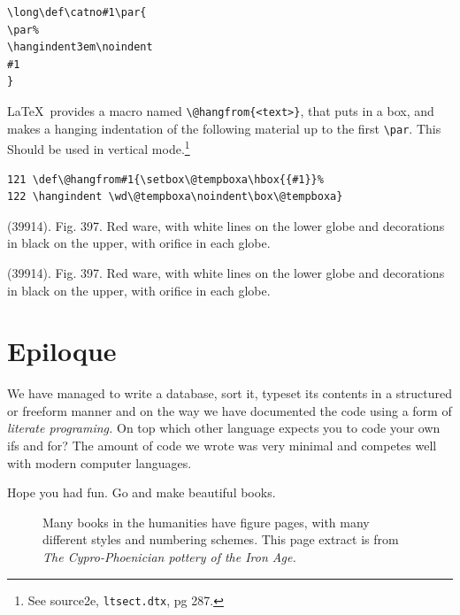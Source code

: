 \begin{verbatim}
\long\def\catno#1\par{
\par%
\hangindent3em\noindent
#1
}
\end{verbatim}


\def\catno#1#2{%
    \@hangfrom{#1. }#2
}


\DescribeMacro{\@hangfrom}   
\LaTeX\ provides a macro named \verb+\@hangfrom{<text>}+, that puts  in a box, and makes a hanging indentation of the following material up to the first \verb+\par+. This Should be used in vertical mode.\footnote{See source2e, \texttt{ltsect.dtx}, pg 287.}

\begin{verbatim}
121 \def\@hangfrom#1{\setbox\@tempboxa\hbox{{#1}}%
122 \hangindent \wd\@tempboxa\noindent\box\@tempboxa}
\end{verbatim}

\medskip

\catno{289}{(39914). Fig. 397. Red ware, with white lines on the lower globe and decorations in black on the upper, with orifice in each globe.}

\catno{1289}{(39914). Fig. 397. Red ware, with white lines on the lower globe and decorations in black on the upper, with orifice in each globe.}


\makeatother

\section{Epiloque}

We have managed to write a database, sort it, typeset its contents in a structured or freeform manner
and on the way we have documented the code using a form of \textit{literate programing.} On top which
other language expects you to code your own ifs and for? 
The amount of code we wrote was very minimal and competes well with modern computer languages. 

Hope you had fun. Go and make beautiful books. 

\begin{figure}[htp]
\centering
{\color{thegray}
}
\caption{Many books in the humanities have figure pages, with many different styles and numbering schemes. This page extract is from \textit{The Cypro-Phoenician pottery of the Iron Age. }  \protect\cite{schreiber1971} }
\end{figure}


